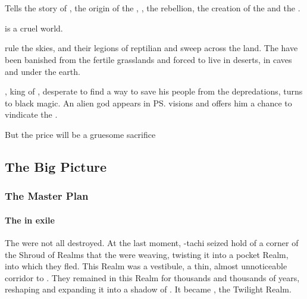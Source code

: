 \chapter{\AvatarofEntropy}
Tells the story of \Semiza, the origin of the \resphain, \Merkyrah, the \resphan{} rebellion, the creation of the \satharioth{} and the \secondbanewar. 





\begin{blurb}
  \Miith{} is a cruel world. 
  
  \Dragons{} rule the skies, and their legions of reptilian \cregorrs{} and \scathae{} sweep across the land. 
  The \nephilim{} have been banished from the fertile grasslands and forced to live in deserts, in caves and under the earth. 
  
  \Semiza, \nephilic{} king of \Numah, desperate to find a way to save his people from the \psp{\dragons}{} depredations, turns to black magic. 
  An alien god appears in \ps{\Semiza}{} visions and offers him a chance to vindicate the \nephilim. 
  
  But the price will be a gruesome sacrifice\prikker
\end{blurb}
















\section{The Big Picture}
\subsection{The \Bane{} Master Plan}
\subsubsection{The \banes{} in exile}
The \banelords{} were not all destroyed. At the last moment, \Daggerrain-tachi seized hold of a corner of the Shroud of Realms that the \ophidians{} were weaving, twisting it into a pocket Realm, into which they fled. This Realm was a vestibule, a thin, almost unnoticeable corridor to \Erebos. They remained in this Realm for thousands and thousands of years, reshaping and expanding it into a shadow of \Erebos. It became \Nyx, the Twilight Realm. 






